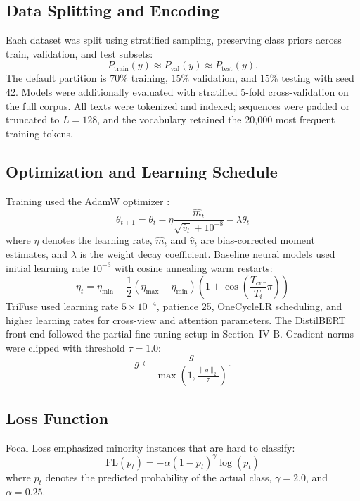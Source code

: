 \subsection{Data Splitting and Encoding}

Each dataset was split using stratified sampling, preserving class priors across train, validation, and test subsets:
\[
P_{\mathrm{train}}(y) \approx P_{\mathrm{val}}(y) \approx P_{\mathrm{test}}(y).
\]
The default partition is 70\% training, 15\% validation, and 15\% testing with seed 42. Models were additionally evaluated with stratified 5-fold cross-validation on the full corpus. All texts were tokenized and indexed; sequences were padded or truncated to $L=128$, and the vocabulary retained the 20,000 most frequent training tokens.

\subsection{Optimization and Learning Schedule}

Training used the AdamW optimizer \cite{ref25}:
\begin{equation}
\theta_{t+1} = \theta_t - \eta \frac{\hat{m}_t}{\sqrt{\hat{v}_t} + 10^{-8}} - \lambda \theta_t
\end{equation}
where $\eta$ denotes the learning rate, $\hat{m}_t$ and $\hat{v}_t$ are bias-corrected moment estimates, and $\lambda$ is the weight decay coefficient. Baseline neural models used initial learning rate $10^{-3}$ with cosine annealing warm restarts:
\begin{equation}
\eta_t = \eta_{\min} + \frac{1}{2}(\eta_{\max} - \eta_{\min}) \left(1 + \cos\left(\frac{T_{\mathrm{cur}}}{T_i}\pi\right)\right)
\end{equation}
TriFuse used learning rate $5 \times 10^{-4}$, patience 25, OneCycleLR scheduling, and higher learning rates for cross-view and attention parameters. The DistilBERT front end followed the partial fine-tuning setup in Section~IV-B. Gradient norms were clipped with threshold $\tau = 1.0$:
\[
g \leftarrow \frac{g}{\max\left(1, \frac{\|g\|_2}{\tau}\right)}.
\]

\subsection{Loss Function}

Focal Loss \cite{ref23} emphasized minority instances that are hard to classify:
\begin{equation}
\mathrm{FL}(p_t) = -\alpha (1 - p_t)^\gamma \log(p_t)
\end{equation}
where $p_t$ denotes the predicted probability of the actual class, $\gamma = 2.0$, and $\alpha = 0.25$.

